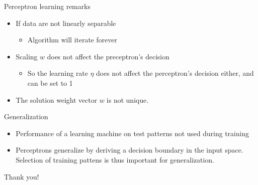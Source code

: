\documentclass[notes]{beamer}
\newcommand{\chuhao}{\fontsize{44.9pt}{\baselineskip}\selectfont}
\providecommand{\tightlist}{%
  \setlength{\itemsep}{0pt}\setlength{\parskip}{0pt}}
\begin{document}
\begin{frame}{Perceptron learning remarks}

\begin{itemize}
\tightlist
\item
  If data are not linearly separable

  \begin{itemize}
  \tightlist
  \item
    Algorithm will iterate forever
  \end{itemize}
\item
  Scaling \(w\) does not affect the preceptron's decision

  \begin{itemize}
  \tightlist
  \item
    So the learning rate \(\eta\) does not affect the perceptron's
    decision either, and can be set to 1
  \end{itemize}
\item
  The solution weight vector \(w\) is not unique.
\end{itemize}

\end{frame}

\begin{frame}{Generalization}

\begin{itemize}
\tightlist
\item
  Performance of a learning machine on test patterns not used during
  training
\item
  Perceptrons generalize by deriving a decision boundary in the input
  space. Selection of training pattens is thus important for
  generalization.
\end{itemize}

\end{frame}

\begin{frame}
	\chuhao Thank you! %
\end{frame}
\end{document}
